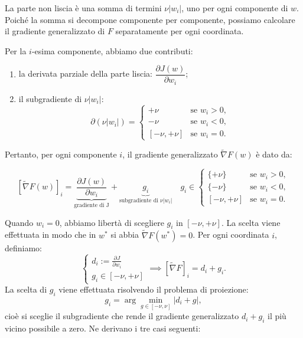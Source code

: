 \documentclass[italian, a4paper, twoside, binding=6mm]{sapthesis}
\begin{document}
La parte non liscia è una somma di termini $\nu |w_i|$, uno per ogni componente
di $w$. Poiché la somma si decompone componente per componente, possiamo
calcolare il gradiente generalizzato di $F$ separatamente per ogni coordinata.

Per la $i$-esima componente, abbiamo due contributi:

\begin{enumerate}
    \item la derivata parziale della parte liscia: $\dfrac{\partial J(w)}{\partial w_i}$;
    \item il subgradiente di $\nu |w_i|$:
    \[
    \partial (\nu |w_i|) =
    \begin{cases}
    +\nu & \text{se } w_i > 0, \\
    -\nu & \text{se } w_i < 0, \\
    [-\nu, +\nu] & \text{se } w_i = 0.
    \end{cases}
    \]
    \end{enumerate}

Pertanto, per ogni componente $i$, il gradiente generalizzato $\widetilde{\nabla} F(w)$
è dato da:

\[
[\widetilde{\nabla} F(w)]_i =
\underbrace{\frac{\partial J(w)}{\partial w_i}}_{\text{gradiente di J}}
+
\underbrace{g_i}_{\text{subgradiente di }\nu |w_i|} \quad
g_i \in
\begin{cases}
\{+\nu\} & \text{se } w_i > 0, \\
\{-\nu\} & \text{se } w_i < 0, \\
[-\nu, +\nu] & \text{se } w_i = 0.
\end{cases}
\]


Quando $w_i = 0$, abbiamo libertà di scegliere $g_i$ in $[-\nu, +\nu]$.
La scelta viene effettuata in modo che in $w^*$ si abbia $\widetilde{\nabla}F(w^*) = 0$.
Per ogni coordinata \(i\), definiamo:
\[
\begin{cases}d_i := \frac{\partial J}{\partial w_i} \\
g_i \in [-\nu, +\nu]\end{cases}\implies 
[\widetilde{\nabla}F]_i = d_i + g_i.
\]
La scelta di \(g_i\) viene effettuata risolvendo il problema di proiezione:
\[
g_i = \arg\min_{g \in [-\nu, \nu]} |d_i + g|,
\]
cioè si sceglie il subgradiente che rende il gradiente generalizzato \(d_i + g_i\) il più vicino possibile a zero. Ne derivano i tre casi seguenti:
\end{document}
